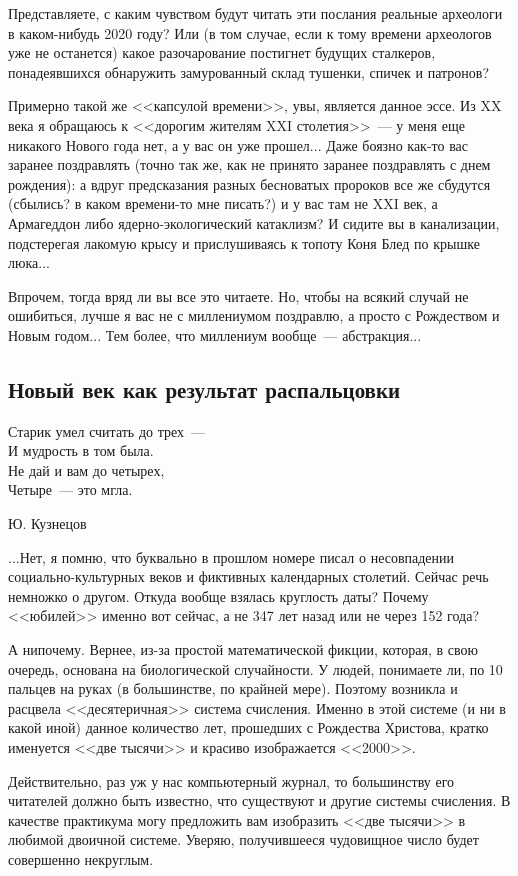 \documentclass{scrbook}
\makeatletter
\newcommand{\defaultepigraphwidth}{0.5} %
\newcommand{\flqq}{<<}
\newcommand{\frqq}{>>}
\newcommand{\mdash}{~--- }
\newcommand{\essaysection}[1]{\subsection*{#1}\nopagebreak}
\newcommand{\myepigraph}[3][\@empty]{
	\ifx\@empty#1
		\setlength{\epigraphwidth}{\defaultepigraphwidth\textwidth}
	\else
		\setlength{\epigraphwidth}{#1\textwidth}
	\fi
	\epigraph{#2}{#3}
	\setlength{\epigraphwidth}{\defaultepigraphwidth\textwidth} %
	\nopagebreak
}
\makeatother
\begin{document}
Представляете, с каким чувством будут читать эти послания реальные археологи в каком-нибудь 2020 году? Или (в том случае, если к тому времени археологов уже не останется) какое разочарование постигнет будущих сталкеров, понадеявшихся обнаружить замурованный склад тушенки, спичек и патронов?

Примерно такой же {\flqq}капсулой времени{\frqq}, увы, является данное эссе. Из XX века я обращаюсь к {\flqq}дорогим жителям XXI столетия{\frqq}{\mdash}у меня еще никакого Нового года нет, а у вас он уже прошел... Даже боязно как-то вас заранее поздравлять (точно так же, как не принято заранее поздравлять с днем рождения): а вдруг предсказания разных бесноватых пророков все же сбудутся (сбылись? в каком времени-то мне писать?) и у вас там не XXI век, а Армагеддон либо ядерно-экологический катаклизм? И сидите вы в канализации, подстерегая лакомую крысу и прислушиваясь к топоту Коня Блед по крышке люка...

Впрочем, тогда вряд ли вы все это читаете. Но, чтобы на всякий случай не ошибиться, лучше я вас не с миллениумом поздравлю, а просто с Рождеством и Новым годом... Тем более, что миллениум вообще{\mdash}абстракция...

\essaysection{Новый век как результат распальцовки}

\myepigraph{Старик умел считать до трех{\mdash}\\
И мудрость в том была. \\
Не дай и вам до четырех, \\
Четыре{\mdash}это мгла.}
{Ю. Кузнецов}

...Нет, я помню, что буквально в прошлом номере писал о несовпадении социально-культурных веков и фиктивных календарных столетий. Сейчас речь немножко о другом. Откуда вообще взялась круглость даты? Почему {\flqq}юбилей{\frqq} именно вот сейчас, а не 347 лет назад или не через 152 года?

А нипочему. Вернее, из-за простой математической фикции, которая, в свою очередь, основана на биологической случайности. У людей, понимаете ли, по 10 пальцев на руках (в большинстве, по крайней мере). Поэтому возникла и расцвела {\flqq}десятеричная{\frqq} система счисления. Именно в этой системе (и ни в какой иной) данное количество лет, прошедших с Рождества Христова, кратко именуется {\flqq}две тысячи{\frqq} и красиво изображается {\flqq}2000{\frqq}.

Действительно, раз уж у нас компьютерный журнал, то большинству его читателей должно быть известно, что существуют и другие системы счисления. В качестве практикума могу предложить вам изобразить {\flqq}две тысячи{\frqq} в любимой двоичной системе. Уверяю, получившееся чудовищное число будет совершенно некруглым.
\end{document}
